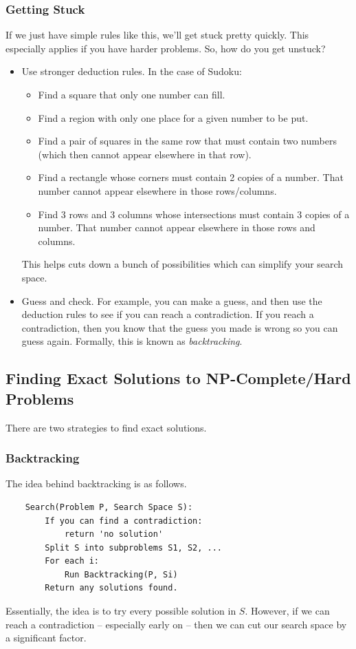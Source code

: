 \documentclass[letterpaper]{article}
\begin{document}
\subsubsection{Getting Stuck}
If we just have simple rules like this, we'll get stuck pretty quickly. This especially applies if you have harder problems. So, how do you get unstuck? 
\begin{itemize}
    \item Use stronger deduction rules. In the case of Sudoku:
    \begin{itemize}
        \item Find a square that only one number can fill.
        \item Find a region with only one place for a given number to be put. 
        \item Find a pair of squares in the same row that must contain two numbers (which then cannot appear elsewhere in that row).
        \item Find a rectangle whose corners must contain 2 copies of a number. That number cannot appear elsewhere in those rows/columns.
        \item Find 3 rows and 3 columns whose intersections must contain 3 copies of a number. That number cannot appear elsewhere in those rows and columns.
    \end{itemize}
    This helps cuts down a bunch of possibilities which can simplify your search space. 

    \item Guess and check. For example, you can make a guess, and then use the deduction rules to see if you can reach a contradiction. If you reach a contradiction, then you know that the guess you made is wrong so you can guess again. Formally, this is known as \emph{backtracking}.
\end{itemize}

\subsection{Finding Exact Solutions to NP-Complete/Hard Problems}
There are two strategies to find exact solutions. 

\subsubsection{Backtracking}
The idea behind backtracking is as follows. 
\begin{verbatim}
    Search(Problem P, Search Space S):
        If you can find a contradiction:
            return 'no solution' 
        Split S into subproblems S1, S2, ... 
        For each i: 
            Run Backtracking(P, Si)
        Return any solutions found. 
\end{verbatim}
Essentially, the idea is to try every possible solution in $S$. However, if we can reach a contradiction -- especially early on -- then we can cut our search space by a significant factor. 
\end{document}
